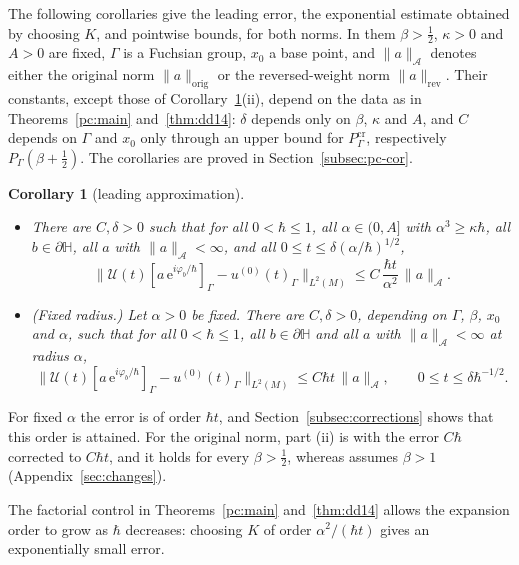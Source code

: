 \documentclass[twoside,10pt]{article}
\numberwithin{equation}{section}
\theoremstyle{slbody}
\newtheorem{corollary}[equation]{Corollary}
\theoremstyle{remark}
\newcommand{\Hb}{\mathbb{H}}
\newcommand{\norm}[1]{\lVert #1\rVert}
\newcommand{\ue}{\mathrm{e}}
\newcommand{\cU}{\mathcal{U}}
\newcommand{\pcNorm}[1]{\norm{#1}_{\mathrm{orig}}}
\newcommand{\swNorm}[1]{\norm{#1}_{\mathrm{rev}}}
\begin{document}
The following corollaries give the leading error, the exponential estimate obtained by choosing $K$, and pointwise
bounds, for both norms. In them $\beta>\tfrac12$, $\kappa>0$ and $A>0$ are fixed, $\Gamma$ is a Fuchsian group, $x_0$ a base point,
and $\norm a_{\mathcal A}$ denotes either the original norm $\pcNorm a$ or the reversed-weight norm $\swNorm a$. Their constants,
except those of Corollary~\ref{pc:thm13}(ii), depend on the data as in Theorems~\ref{pc:main} and~\ref{thm:dd14}: $\delta$ depends only on $\beta$, $\kappa$ and $A$, and $C$ depends on
$\Gamma$ and $x_0$ only through an upper bound for $P^{\mathrm{cr}}_\Gamma$, respectively $P_\Gamma(\beta+\tfrac12)$. The corollaries are
proved in Section~\ref{subsec:pc-cor}.

\begin{corollary}[leading approximation]\label{pc:thm13}
\begin{itemize}
\item[\textup{(i)}] There are $C,\delta>0$ such that for all $0<\hbar\le1$, all $\alpha\in(0,A]$ with $\alpha^3\ge\kappa\hbar$, all
$b\in\partial\Hb$, all $a$ with $\norm a_{\mathcal A}<\infty$, and all $0\le t\le\delta(\alpha/\hbar)^{1/2}$,
\[
  \norm{\cU(t)[a\,\ue^{i\varphi_b/\hbar}]_\Gamma-u^{(0)}(t)_\Gamma}_{L^2(M)}\le C\,\frac{\hbar t}{\alpha^2}\,\norm a_{\mathcal A}.
\]
\item[\textup{(ii)}] \emph{(Fixed radius.)} Let $\alpha>0$ be fixed. There are $C,\delta>0$, depending on $\Gamma$, $\beta$, $x_0$ and
$\alpha$, such that for all $0<\hbar\le1$, all $b\in\partial\Hb$ and all $a$ with $\norm a_{\mathcal A}<\infty$ at radius $\alpha$,
\[
  \norm{\cU(t)[a\,\ue^{i\varphi_b/\hbar}]_\Gamma-u^{(0)}(t)_\Gamma}_{L^2(M)}\le C\hbar t\,\norm a_{\mathcal A},\qquad 0\le t\le\delta\hbar^{-1/2}.
\]
\end{itemize}
\end{corollary}

For fixed $\alpha$ the error is of order $\hbar t$, and Section~\ref{subsec:corrections} shows that this order is attained. For the
original norm, part (ii) is \cite[Theorem~1.3]{S} with the error $C\hbar$ corrected to $C\hbar t$, and it holds for every
$\beta>\tfrac12$, whereas \cite[Theorem~1.3]{S} assumes $\beta>1$ (Appendix~\ref{sec:changes}).

The factorial control in Theorems~\ref{pc:main} and~\ref{thm:dd14} allows the expansion order to grow as $\hbar$ decreases:
choosing $K$ of order $\alpha^2/(\hbar t)$ gives an exponentially small error.
\end{document}
